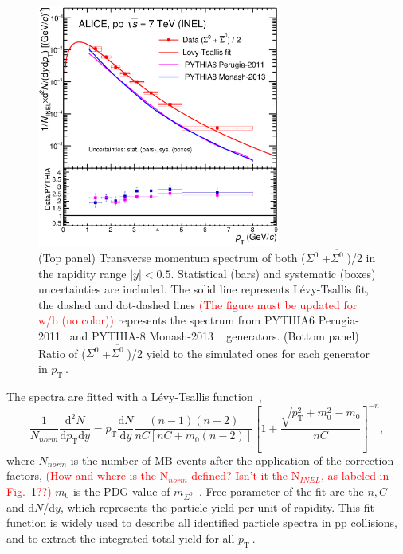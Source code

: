\documentclass[ALICE,manyauthors]{cernphprep}
\newcommand{\dndy}{d$N$/d$y$}
\newcommand{\sig}{\ensuremath{\Sigma^0  \; }}
\newcommand{\asig}{\ensuremath{\overline{\Sigma^0} \; }}
\newcommand{\pt}{\ensuremath{p_{\mathrm{T}\; }}}
\newcommand{\red}{\textcolor{red}}
\begin{document}
\begin{figure}[h!]
\centering
 \includegraphics[width=8.0cm]{Figure/CM-6feb18-Data-LTfit-Pyt6-Pyt8.eps}

  \caption{(Top panel) Transverse momentum spectrum of both (\sig+\asig)/2 in  the rapidity range $|y|<0.5$. 
  Statistical (bars) and systematic (boxes) uncertainties are included. The solid line
  represents L\'{e}vy-Tsallis fit, the dashed and dot-dashed lines \red{(The figure must be updated for w/b (no color))} 
  represents the spectrum from PYTHIA6 Perugia-2011~\cite{cite:pythia6} and PYTHIA-8 Monash-2013
  ~\cite{cite:PYTHIA-8-Monash-gener} generators.
  (Bottom panel) Ratio of (\sig+\asig)/2 yield to the simulated ones for each generator in \pt.
  }
 \label{fig:spectra}
\end{figure}

The spectra are fitted with a L\'{e}vy-Tsallis function~\cite{cite:Tsallis}, 
\begin{equation}
\frac{1}{N_{norm}}\frac{\mathrm{d}^2N}{\mathrm{d}p_{\mathrm{T}}\mathrm{d}y} = p_{\mathrm{T}} 
\frac{\mathrm{d}N}{\mathrm{d}y} \frac{(n-1)(n-2)}{nC[nC+m_{0}(n-2)]}\left[1+
\frac{\sqrt{p_{\mathrm{T}}^2+m_{0}^{2}}-m_{0}}{nC}\right]^{-n},
\label{eqn:funclevy}
\end{equation}
where $N_{norm}$ is the number of MB events after the application of the correction factors, 
\red{(How and where is the N$_{norm}$ defined? Isn't it the N$_{INEL}$, as labeled in Fig.~\ref{fig:spectra}??)}
$m_0$ is the PDG value of $m_{\Sigma^0}$~\cite{cite:PDG}. Free parameter of the fit are the $n, C$ and \dndy, which represents 
the particle yield per unit of rapidity. This fit function is widely used to describe all identified particle spectra in pp 
collisions\cite{cite:Xi_pp,cite:KphipPb, cite:lambda_pp}, and to extract the integrated total yield for all \pt.
\end{document}
